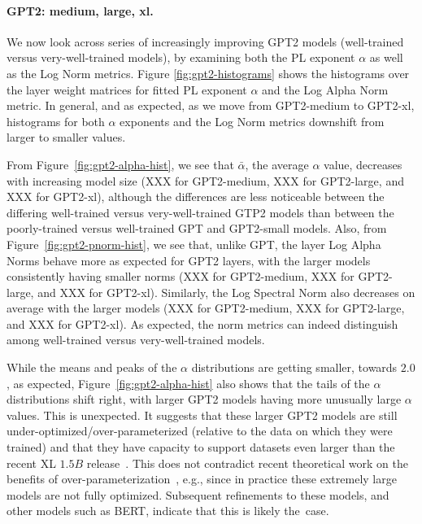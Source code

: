 \paragraph{GPT2: medium, large, xl.} 

We now look across series of increasingly improving GPT2 models (well-trained versus very-well-trained models), by examining both the PL exponent $\alpha$ as well as the Log Norm metrics.  
Figure \ref{fig:gpt2-histograms} shows the histograms over the layer weight matrices for fitted PL exponent $\alpha$ and the Log Alpha Norm metric. 
In general, and as expected, as we move from GPT2-medium to GPT2-xl, histograms for both $\alpha$ exponents and the Log Norm metrics downshift from larger to smaller values. 

From Figure~\ref{fig:gpt2-alpha-hist}, we see that
$\bar{\alpha}$, the average $\alpha$ value, decreases with increasing model size (XXX for GPT2-medium, XXX for GPT2-large, and XXX for GPT2-xl), although the differences are less noticeable between the differing well-trained versus very-well-trained GTP2 models than between the poorly-trained versus well-trained GPT and GPT2-small models.
Also, from Figure~\ref{fig:gpt2-pnorm-hist}, we see that, 
unlike GPT, the layer Log Alpha Norms behave more as expected for GPT2 layers, with the larger models consistently having smaller norms (XXX for GPT2-medium, XXX for GPT2-large, and XXX for GPT2-xl). 
Similarly, the Log Spectral Norm also decreases on average with the larger models (XXX for GPT2-medium, XXX for GPT2-large, and XXX for GPT2-xl).
As expected, the norm metrics can indeed distinguish among well-trained versus very-well-trained models.


While the means and peaks of the $\alpha$ distributions are getting smaller, towards $2.0$, as expected, Figure~\ref{fig:gpt2-alpha-hist} also shows that the tails of the $\alpha$ distributions shift right, with larger GPT2 models having more unusually large $\alpha$ values.
This is unexpected.
It suggests that these larger GPT2 models are still under-optimized/over-parameterized (relative to the data on which they were trained) and that they have capacity to support datasets even larger than the recent XL $1.5B$ release~\cite{gpt2-xl}.
This does not contradict recent theoretical work on the benefits of over-parameterization~\cite{BHMM19}, e.g., since in practice these extremely large models are not fully optimized.
Subsequent refinements to these models, and other models such as BERT, indicate that this is likely the~case.

